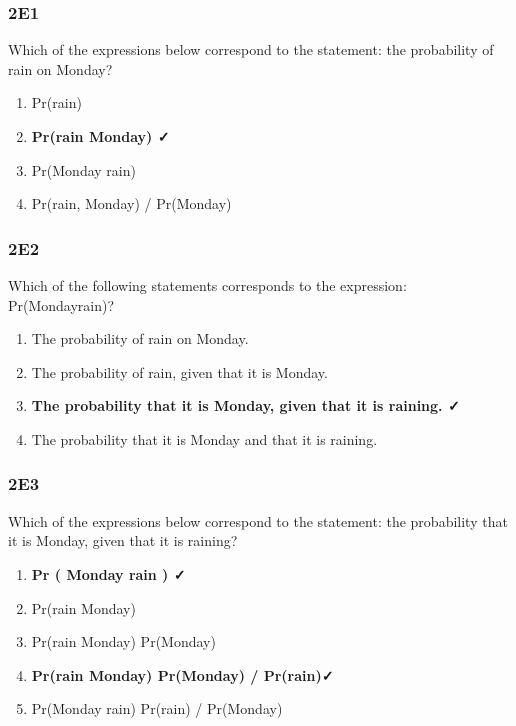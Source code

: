 \documentclass[
]{book}
\providecommand{\tightlist}{%
  \setlength{\itemsep}{0pt}\setlength{\parskip}{0pt}}
\begin{document}
\hypertarget{e1}{%
\subsubsection*{2E1}\label{e1}}

Which of the expressions below correspond to the statement: the probability of rain on Monday?

\begin{enumerate}
\def\labelenumi{\arabic{enumi}.}
\tightlist
\item
  Pr(rain)
\item
  \textbf{Pr(rain \textbar{} Monday) ✓}
\item
  Pr(Monday \textbar{} rain)
\item
  Pr(rain, Monday) / Pr(Monday)
\end{enumerate}

\hypertarget{e2}{%
\subsubsection*{2E2}\label{e2}}

Which of the following statements corresponds to the expression: Pr(Monday\textbar rain)?

\begin{enumerate}
\def\labelenumi{\arabic{enumi}.}
\tightlist
\item
  The probability of rain on Monday.
\item
  The probability of rain, given that it is Monday.
\item
  \textbf{The probability that it is Monday, given that it is raining. ✓}
\item
  The probability that it is Monday and that it is raining.
\end{enumerate}

\hypertarget{e3}{%
\subsubsection*{2E3}\label{e3}}

Which of the expressions below correspond to the statement: the probability that it is Monday, given that it is raining?

\begin{enumerate}
\def\labelenumi{\arabic{enumi}.}
\tightlist
\item
  \textbf{Pr ( Monday \textbar{} rain ) ✓}
\item
  Pr(rain \textbar{} Monday)
\item
  Pr(rain \textbar{} Monday) Pr(Monday)
\item
  \textbf{Pr(rain \textbar{} Monday) Pr(Monday) / Pr(rain)✓}
\item
  Pr(Monday \textbar{} rain) Pr(rain) / Pr(Monday)
\end{enumerate}
\end{document}
